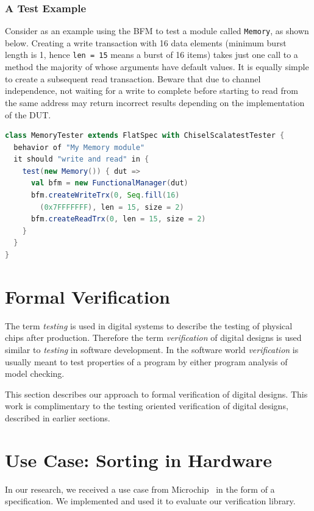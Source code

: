\documentclass[conference]{IEEEtran}
\begin{document}
\subsubsection{A Test Example}
Consider as an example using the BFM to test a module called \texttt{Memory}, as shown below. Creating a write transaction with 16 data elements (minimum burst length is 1, hence \texttt{len = 15} means a burst of 16 items) takes just one call to a method the majority of whose arguments have default values. It is equally simple to create a subsequent read transaction. Beware that due to channel independence, not waiting for a write to complete before starting to read from the same address may return incorrect results depending on the implementation of the DUT.
\begin{lstlisting}[language=scala, caption={Using the AXI4 BFM with ChiselTest}, label={lst:axitest}]
class MemoryTester extends FlatSpec with ChiselScalatestTester {
  behavior of "My Memory module"
  it should "write and read" in {
    test(new Memory()) { dut =>
      val bfm = new FunctionalManager(dut)
      bfm.createWriteTrx(0, Seq.fill(16)
      	(0x7FFFFFFF), len = 15, size = 2)
      bfm.createReadTrx(0, len = 15, size = 2)
    }
  }
}
\end{lstlisting}

\section{Formal Verification}

The term \emph{testing} is used in digital systems to describe the testing of physical chips
after production.
Therefore the term \emph{verification} of digital designs is used similar to \emph{testing} in
software development. In the software world \emph{verification} is usually meant to test
properties of a program by either program analysis of model checking.

This section describes our approach to formal verification of digital designs.
This work is complimentary to the testing oriented verification of digital designs,
described in earlier sections.

\section{Use Case: Sorting in Hardware}

In our research, we received a use case from Microchip~\cite{microchip} in the form of a specification.
We implemented and used it to evaluate our verification library.
\end{document}
